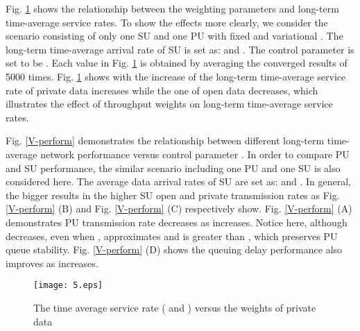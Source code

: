 \documentclass[journal]{IEEEtran}
\begin{document}
{ Fig. \ref{theta-r} shows the relationship between the weighting parameters and  long-term time-average service rates. To show the effects more clearly, we consider the scenario consisting of only one SU and one PU with fixed   and  variational . The  long-term time-average arrival rate of SU is set as:  and . The control parameter  is set to be .  Each value in Fig. \ref{theta-r} is obtained by averaging the converged results of 5000 times. Fig. \ref{theta-r}  shows with the increase of  the long-term time-average  service rate  of private data increases while the one of open data decreases, which illustrates the effect of throughput weights on long-term time-average  service rates. }


 Fig. \ref{V-perform}  demonstrates the relationship between different long-term time-average network performance versus control
 parameter . In order to compare PU and SU performance, the similar scenario including one PU and one SU is also considered here. The average data arrival rates of SU  are set as:  and .  In general, the bigger   results in the
 higher SU open and private transmission rates as  Fig. \ref{V-perform} (B) and  Fig. \ref{V-perform} (C) respectively show.
 Fig. \ref{V-perform} (A) demonstrates PU transmission rate decreases as  increases.  Notice here, although  decreases, even when , 
 approximates  and is greater than , which preserves PU queue stability. Fig. \ref{V-perform} (D) shows
 the
 queuing delay performance also improves as  increases.

\begin{figure}
\centering
\texttt{[image: 5.eps]}
\caption{ The time average service rate ( and ) versus the weights of private data  }
\label{theta-r}
\end{figure}
\end{document}
